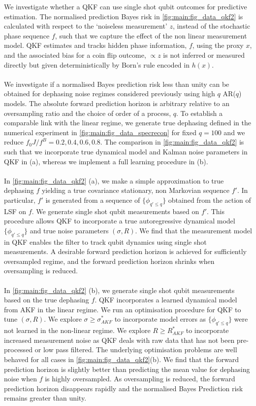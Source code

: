 We investigate whether a QKF can use single shot qubit outcomes for predictive estimation. The normalised prediction Bayes risk in  \cref{fig:main:fig_data_qkf2} is calculated with respect to the `noiseless measurement' $z$, instead of the stochastic phase sequence $f$, such that we capture the effect of the non linear measurement model. QKF estimates and tracks hidden phase information, $f$, using the proxy $x$, and the associated bias for a coin flip outcome, $\propto z$ is not inferred or measured directly but given deterministically by Born's rule encoded in  $h(x)$. 
\\
\\
We investigate if a normalised Bayes prediction risk less than unity can be obtained for dephasing noise regimes considered previously using high $q$ AR($q$) models. The absolute forward prediction horizon is arbitrary relative to an oversampling ratio and the choice of order of a process, $q$. To establish a comparable link with the linear regime, we generate true dephasing defined in the numerical experiment in \cref{fig:main:fig_data_specrecon} for fixed $q=100$ and we reduce $f_0 J / f^B = 0.2, 0.4, 0.6, 0.8$. The comparison in \cref{fig:main:fig_data_qkf2} is such that we incorporate true dynamical model and Kalman noise parameters in QKF in (a), whereas we implement a full learning procedure in (b). 
\\
\\
In \cref{fig:main:fig_data_qkf2} (a), we make a simple approximation to true dephasing $f$ yielding a true covariance stationary, non Markovian sequence $f'$. In particular, $f'$ is generated from a sequence of $\{ \phi_{q'\leq q}\}$ obtained from the action of LSF on $f$. We generate single shot qubit measurements based on $f'$. This procedure allows QKF to incorporate a true autoregressive dynamical model $\{ \phi_{q'\leq q}\}$ and true noise parameters $(\sigma, R)$.  We find that the measurement model in QKF enables the filter to track qubit dynamics using single shot measurements. A desirable forward prediction horizon is achieved for sufficiently oversampled regime, and the forward prediction horizon shrinks when oversampling is reduced. 
\\
\\
In \cref{fig:main:fig_data_qkf2} (b), we generate single shot qubit measurements based on the true dephasing $f$. QKF incorporates a learned dynamical model from AKF in the linear regime. We run an optimisation procedure for QKF to tune $(\sigma, R)$. We explore $\sigma \geq \sigma_{AKF}^*$ to incorporate model errors as $\{\phi_{q' \leq q}\}$ were not learned in the non-linear regime.  We explore $R \geq R_{AKF}^*$ to incorporate increased measurement noise as QKF deals with raw data that has not been pre-processed or low pass filtered. The underlying optimisation problems are well behaved for all cases in \cref{fig:main:fig_data_qkf2}(b). We find that the forward prediction horizon is slightly better than predicting the mean value for dephasing noise when $f$ is highly oversampled. As oversampling is reduced, the forward prediction horizon disappears rapidly and the normalised Bayes Prediction risk remains greater than unity. 
